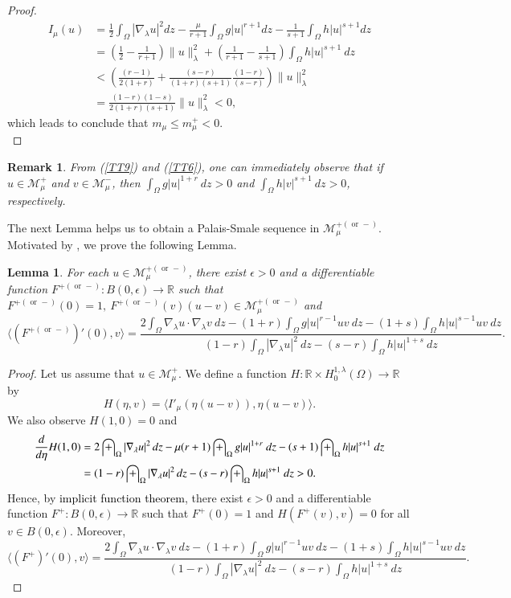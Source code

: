 \documentclass[12pt, notitlepage]{article}
\def\R{\mathbb{R}}
\newtheorem{lem}[theorem]{Lemma}
\newtheorem{rmk}[theorem]{Remark}
\begin{document}
{\begin{proof}
\begin{align}
    I_\mu(u)&=\frac{1}{2}\int_\Omega |\nabla_\lambda u|^2 dz-\frac{\mu}{r+1}\int_\Omega g|u|^{r+1} dz-\frac{1}{s+1}\int_\Omega h|u|^{s+1} dz\nonumber\\
    &=\left (\frac{1}{2}-\frac{1}{r+1}\right )\|u\|^2_\lambda+\left (\frac{1}{r+1}-\frac{1}{s+1}\right )\int_\Omega h|u|^{s+1}\ dz\\
    &<\left (\frac{(r-1)}{2(1+r)}+\frac{(s-r)}{(1+r)(s+1)}\frac{(1-r)}{(s-r)}\right )\|u\|_\lambda^2\nonumber\\
    &=\frac{(1-r)(1-s)}{2(1+r)(s+1)}\|u\|_\lambda^2<0,
\end{align}
which leads to conclude that $m_\mu \leq m^+_\mu<0$.\\
\end{proof}

\begin{rmk}
From (\ref{TT9}) and (\ref{TT6}), one can immediately observe that if $u\in\mathscr{M}_\mu^+$ and $v\in\mathscr{M}_\mu^-$, then $\int_\Omega g|u|^{1+r}\ dz>0$ and $\int_\Omega h|v|^{s+1}\ dz>0$, respectively.
\end{rmk}
The next Lemma helps us to obtain a Palais-Smale sequence in $\mathscr{M}^{+(\text{ or }-)}_\mu$. Motivated by \cite{GT92, WU1, WU}, we prove the following Lemma.
\begin{lem}\label{L}
   For each $u\in\mathscr{M}_\mu^{+(\text{ or }-)}$, there exist $\epsilon>0$ and a differentiable function $F^{+(\text{ or }-)}: B(0,\epsilon)\to \R$ such that $F^{+(\text{ or }-)}(0)=1,\ F^{+(\text{ or }-)}(v)(u-v)\in\mathscr{M}_\mu^{+(\text{ or }-)}$ and $$\langle (F^{+(\text{ or }-)})'(0),v\rangle=\frac{2\int_\Omega \nabla_\lambda u\cdot \nabla_\lambda v\ dz-(1+r)\int_\Omega g|u|^{r-1}uv\ dz-(1+s)\int_\Omega h|u|^{s-1}uv\ dz}{(1-r)\int_\Omega |\nabla_\lambda u|^2\ dz-(s-r)\int_\Omega h|u|^{1+s}\ dz}.$$
\end{lem}
\begin{proof} 
Let us assume that $u\in\mathscr{M}_\mu^+$. We define a function $H:\R\times H^{1,\lambda}_0(\Omega)\to\R$ by
$$H(\eta,v)=\langle I'_\mu(\eta(u-v)),\eta(u-v)\rangle.$$
We also observe $H(1,0)=0$ and 
\begin{align*}
    \frac{d}{d\eta}H(1,0)&=2\int_\Omega |\nabla_\lambda u|^2\, dz-\mu(r+1)\int_\Omega g|u|^{1+r}\ dz-(s+1)\int_\Omega h|u|^{s+1}\ dz\\
    &=(1-r)\int_\Omega |\nabla_\lambda u|^2\, dz-(s-r)\int_\Omega h|u|^{s+1}\ dz>0\textcolor{black}{.}
\end{align*}
Hence, by \textcolor{black}{implicit function theorem}, there exist $\epsilon>0$ and a differentiable function $F^+:B(0,\epsilon)\to\R$ such that $F^+(0)=1$ and $H(F^+(v),v)=0$ for all $v\in B(0,\epsilon)$. Moreover, $$\langle (F^+)'(0),v\rangle=\frac{2\int_\Omega \nabla_\lambda u\cdot \nabla_\lambda v\ dz-(1+r)\int_\Omega g|u|^{r-1}uv\ dz-(1+s)\int_\Omega h|u|^{s-1}uv\ dz}{(1-r)\int_\Omega |\nabla_\lambda u|^2\ dz-(s-r)\int_\Omega h|u|^{1+s}\ dz}.$$

\end{proof}}
\end{document}
